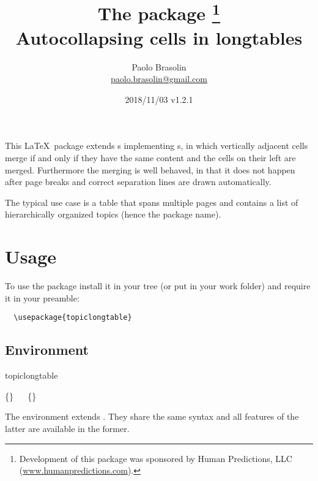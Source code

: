 \documentclass[full,kernel]{l3doc}
\begin{document}
\title{%
  The  package%
  \thanks{Development of this package was sponsored by Human Predictions,
    LLC (\href{http://www.humanpredictions.com}{www.humanpredictions.com}).}\\
  Autocollapsing cells in longtables
}

\author{
  Paolo Brasolin\\
  \href{mailto:paolo.brasolin@gmail.com}{paolo.brasolin@gmail.com}
}

\date{2018/11/03 v1.2.1}

\maketitle

\begin{documentation}


This \LaTeX\ package extends s implementing
s, in which vertically adjacent cells merge if
and only if they have the same content and the cells on their left
are merged.  Furthermore the merging is well behaved, in that it
does not happen after page breaks and correct separation lines are
drawn automatically.

The typical use case is a table that spans multiple pages and
contains a list of hierarchically organized topics (hence the package
name).




\section*{Usage}

To use the package install it in your tree (or put  in your work folder) and require it in your preamble:

\begin{verbatim}
  \usepackage{topiclongtable}
\end{verbatim}




\subsection*{Environment}

\begin{function}{topiclongtable}
  \begin{syntax}
    \{\}
    \ \ 
    \{\}
  \end{syntax}
  The  environment extends .
  They share the same syntax and all features of the latter are
  available in the former.


\end{function}
\end{documentation}
\end{document}
